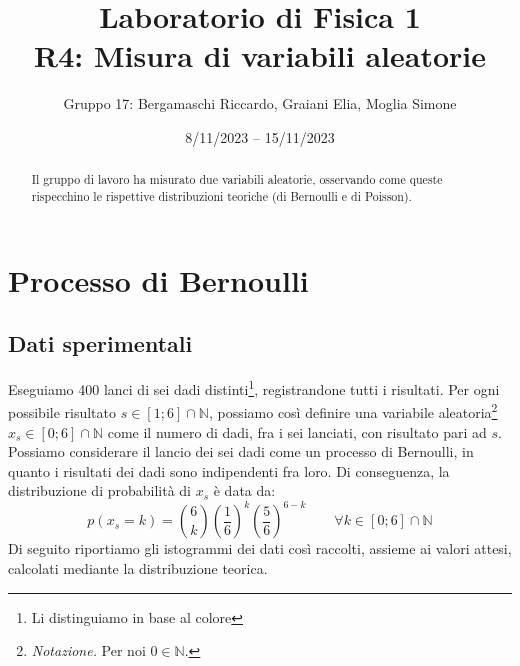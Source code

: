 \documentclass{article}
\title{
    Laboratorio di Fisica 1\\
    R4: Misura di variabili aleatorie
}
\author{Gruppo 17: Bergamaschi Riccardo, Graiani Elia, Moglia Simone}
\date{8/11/2023 – 15/11/2023}
\begin{document}
\maketitle

\begin{abstract}
    Il gruppo di lavoro ha misurato due variabili aleatorie, osservando come queste
    rispecchino le rispettive distribuzioni teoriche (di Bernoulli e di Poisson).
\end{abstract}

\section{Processo di Bernoulli}

\subsection{Dati sperimentali}
Eseguiamo 400 lanci di sei dadi distinti\footnote{Li distinguiamo in base al colore},
registrandone tutti i risultati.
Per ogni possibile risultato $s\in\left[1;6\right]\cap\mathbb{N}$, possiamo così
definire una variabile aleatoria\footnote{\emph{Notazione.} Per noi $0\in\mathbb{N}$.}
$x_s\in\left[0;6\right]\cap\mathbb{N}$ come il
numero di dadi, fra i sei lanciati, con risultato pari ad $s$.
Possiamo considerare il lancio dei sei dadi come un processo di Bernoulli,
in quanto i risultati dei dadi sono indipendenti fra loro. Di conseguenza,
la distribuzione di probabilità di $x_s$ è data da:
\[
    p \left(x_s=k\right) =
        \binom{6}{k}
        \left(\frac{1}{6}\right)^k
        \left(\frac{5}{6}\right)^{6-k}
        \qquad\forall k\in\left[0;6\right]\cap\mathbb{N}
\]
Di seguito riportiamo gli istogrammi dei dati così raccolti, assieme ai valori attesi,
calcolati mediante la distribuzione teorica.
\end{document}
